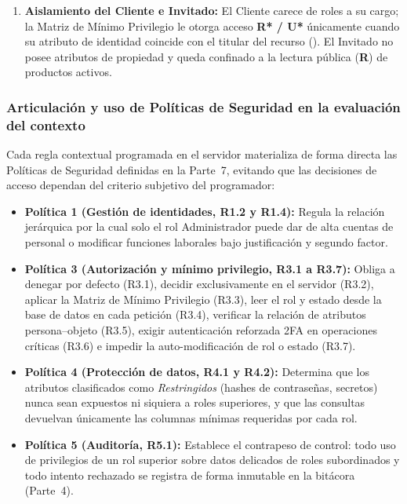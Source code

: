 \documentclass[12pt,letterpaper]{article}
\newcommand{\cod}[1]{\path{#1}}
\begin{document}
\begin{enumerate}
\begin{itemize}
  \end{itemize}
  \item \textbf{Aislamiento del Cliente e Invitado:} El Cliente carece de roles a su cargo; la Matriz de Mínimo Privilegio le otorga acceso \textbf{R* / U*} únicamente cuando su atributo de identidad coincide con el titular del recurso (\cod{id_cliente}). El Invitado no posee atributos de propiedad y queda confinado a la lectura pública (\textbf{R}) de productos activos.
\end{enumerate}

\subsubsection{Articulación y uso de Políticas de Seguridad en la evaluación del contexto}

Cada regla contextual programada en el servidor materializa de forma directa las Políticas de Seguridad definidas en la Parte~7, evitando que las decisiones de acceso dependan del criterio subjetivo del programador:
\begin{itemize}
  \item \textbf{Política 1 (Gestión de identidades, R1.2 y R1.4):} Regula la relación jerárquica por la cual solo el rol Administrador puede dar de alta cuentas de personal o modificar funciones laborales bajo justificación y segundo factor.
  \item \textbf{Política 3 (Autorización y mínimo privilegio, R3.1 a R3.7):} Obliga a denegar por defecto (R3.1), decidir exclusivamente en el servidor (R3.2), aplicar la Matriz de Mínimo Privilegio (R3.3), leer el rol y estado desde la base de datos en cada petición (R3.4), verificar la relación de atributos persona--objeto (R3.5), exigir autenticación reforzada 2FA en operaciones críticas (R3.6) e impedir la auto-modificación de rol o estado (R3.7).
  \item \textbf{Política 4 (Protección de datos, R4.1 y R4.2):} Determina que los atributos clasificados como \emph{Restringidos} (hashes de contraseñas, secretos) nunca sean expuestos ni siquiera a roles superiores, y que las consultas devuelvan únicamente las columnas mínimas requeridas por cada rol.
  \item \textbf{Política 5 (Auditoría, R5.1):} Establece el contrapeso de control: todo uso de privilegios de un rol superior sobre datos delicados de roles subordinados y todo intento rechazado se registra de forma inmutable en la bitácora (Parte~4).
\end{itemize}
\end{document}

